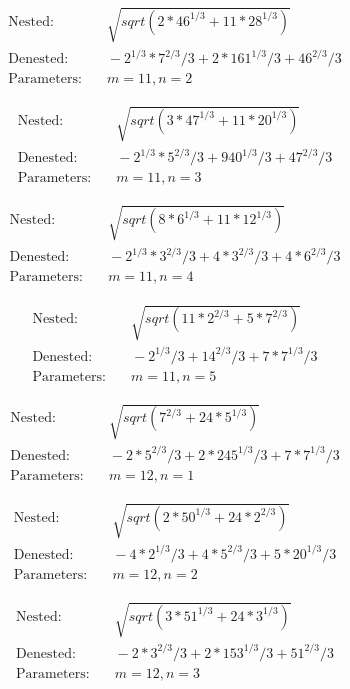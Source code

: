 \begin{align*}
\text{Nested:} &\quad \sqrt{sqrt(2*46^{1/3} + 11*28^{1/3})} \\
\text{Denested:} &\quad -2^{1/3}*7^{2/3}/3 + 2*161^{1/3}/3 + 46^{2/3}/3 \\
\text{Parameters:} &\quad m=11, n=2
\end{align*}

\begin{align*}
\text{Nested:} &\quad \sqrt{sqrt(3*47^{1/3} + 11*20^{1/3})} \\
\text{Denested:} &\quad -2^{1/3}*5^{2/3}/3 + 940^{1/3}/3 + 47^{2/3}/3 \\
\text{Parameters:} &\quad m=11, n=3
\end{align*}

\begin{align*}
\text{Nested:} &\quad \sqrt{sqrt(8*6^{1/3} + 11*12^{1/3})} \\
\text{Denested:} &\quad -2^{1/3}*3^{2/3}/3 + 4*3^{2/3}/3 + 4*6^{2/3}/3 \\
\text{Parameters:} &\quad m=11, n=4
\end{align*}

\begin{align*}
\text{Nested:} &\quad \sqrt{sqrt(11*2^{2/3} + 5*7^{2/3})} \\
\text{Denested:} &\quad -2^{1/3}/3 + 14^{2/3}/3 + 7*7^{1/3}/3 \\
\text{Parameters:} &\quad m=11, n=5
\end{align*}

\begin{align*}
\text{Nested:} &\quad \sqrt{sqrt(7^{2/3} + 24*5^{1/3})} \\
\text{Denested:} &\quad -2*5^{2/3}/3 + 2*245^{1/3}/3 + 7*7^{1/3}/3 \\
\text{Parameters:} &\quad m=12, n=1
\end{align*}

\begin{align*}
\text{Nested:} &\quad \sqrt{sqrt(2*50^{1/3} + 24*2^{2/3})} \\
\text{Denested:} &\quad -4*2^{1/3}/3 + 4*5^{2/3}/3 + 5*20^{1/3}/3 \\
\text{Parameters:} &\quad m=12, n=2
\end{align*}

\begin{align*}
\text{Nested:} &\quad \sqrt{sqrt(3*51^{1/3} + 24*3^{1/3})} \\
\text{Denested:} &\quad -2*3^{2/3}/3 + 2*153^{1/3}/3 + 51^{2/3}/3 \\
\text{Parameters:} &\quad m=12, n=3
\end{align*}

